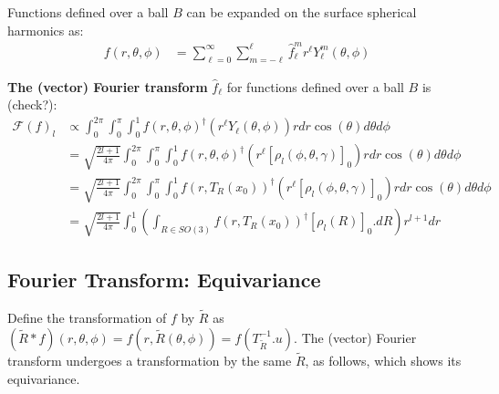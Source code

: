 \documentclass{article}
\begin{document}
Functions defined over a ball $B$ can be expanded on the surface spherical harmonics as:
\begin{align*}
       f(r, \theta, \phi)
        &=\sum_{\ell=0}^{\infty} \sum_{m=-\ell}^{\ell}
            \hat{f}_{\ell}^m r^{\ell} Y_{\ell}^m(\theta, \phi)
\end{align*}


\textbf{The (vector) Fourier transform} $\hat{f}_\ell$ for functions defined over a ball $B$ is (check?):
\begin{align*}
  \mathcal{F}(f)_{l}
    &\propto \int_0^{2 \pi}\int_0^{\pi} \int_0^1 f(r, \theta, \phi)^\dagger  \left( r^{\ell} Y_{\ell}(\theta, \phi)\right) r d r \cos(\theta) d\theta d\phi \\
    &= \sqrt{\frac{2l+1}{4\pi}}  \int_0^{2 \pi}\int_0^{\pi} \int_0^1 f(r, \theta, \phi)^\dagger  \left( r^{\ell}  [\rho_l(\phi, \theta, \gamma)]_0 \right) r d r \cos(\theta) d\theta d\phi \\
    &= \sqrt{\frac{2l+1}{4\pi}}  \int_0^{2 \pi}\int_0^{\pi} \int_0^1 f(r, T_R(x_0))^\dagger  \left( r^{\ell}  [\rho_l(\phi, \theta, \gamma)]_0 \right) r d r \cos(\theta) d\theta d\phi \\
    &=\sqrt{\frac{2l+1}{4\pi}} \int_0^1 \left(\int_{R \in SO(3)} f(r, T_R(x_0))^\dagger [\rho_l(R)]_0. dR\right) r^{l+1} dr
\end{align*}

\subsection{Fourier Transform: Equivariance}

Define the transformation of $f$ by $\tilde R$ as $(\tilde{R} \ast f)(r, \theta, \phi) = f(r, \tilde R (\theta, \phi)) = f(T_{\tilde R}^{-1}.u)$. The (vector) Fourier transform undergoes a transformation by the same $\tilde R$, as follows, which shows its equivariance.
\end{document}
